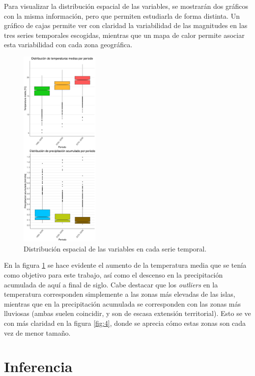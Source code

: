 \documentclass[9pt,twocolumn,twoside]{opticajnl}
\begin{document}
Para visualizar la distribución espacial de las variables, se mostrarán dos gráficos con la misma información, pero que permiten estudiarla de forma distinta. Un gráfico de cajas permite ver con claridad la variabilidad de las magnitudes en las tres series temporales escogidas, mientras que un mapa de calor permite asociar esta variabilidad con cada zona geográfica. 

\begin{figure}[H]
\centering
\includegraphics[width=0.345\textwidth]{fotos/plot_esp.pdf}
\caption{Distribución espacial de las variables en cada serie temporal.}
\label{fig:3}
\end{figure}

En la figura \ref{fig:3} se hace evidente el aumento de la temperatura media que se tenía como objetivo para este trabajo, así como el descenso en la precipitación acumulada de aquí a final de siglo. Cabe destacar que los \textit{outliers} en la temperatura corresponden simplemente a las zonas más elevadas de las islas, mientras que en la precipitación acumulada se corresponden con las zonas más lluviosas (ambas suelen coincidir, y son de escasa extensión territorial). Esto se ve con más claridad en la figura \ref{fig:4}, donde se aprecia cómo estas zonas son cada vez de menor tamaño.

\section{Inferencia}
\end{document}
